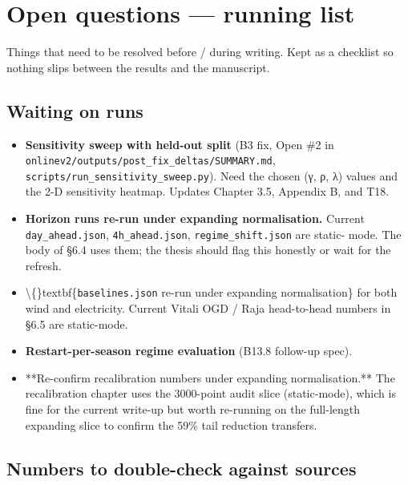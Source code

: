 \documentclass[11pt,a4paper,openany]{report}
\begin{document}
\chapter{Open questions — running list}

Things that need to be resolved before / during writing. Kept as a
checklist so nothing slips between the results and the manuscript.

\section{Waiting on runs}

\begin{itemize}
  \item [ ] \textbf{Sensitivity sweep with held-out split} (B3 fix, Open \#2 in
    \texttt{onlinev2/outputs/post\_fix\_deltas/SUMMARY.md},
    \texttt{scripts/run\_sensitivity\_sweep.py}). Need the chosen (γ, ρ, λ)
    values and the 2-D sensitivity heatmap. Updates Chapter 3.5,
    Appendix B, and T18.
  \item [ ] \textbf{Horizon runs re-run under expanding normalisation.} Current
    \texttt{day\_ahead.json}, \texttt{4h\_ahead.json}, \texttt{regime\_shift.json} are static-
    mode. The body of §6.4 uses them; the thesis should flag this
    honestly or wait for the refresh.
  \item [ ] \textbackslash\{\}textbf\{\texttt{baselines.json} re-run under expanding normalisation\} for
    both wind and electricity. Current Vitali OGD / Raja head-to-head
    numbers in §6.5 are static-mode.
  \item [ ] \textbf{Restart-per-season regime evaluation} (B13.8 follow-up
    spec).
  \item [ ] **Re-confirm recalibration numbers under expanding
    normalisation.** The recalibration chapter uses the 3000-point
    audit slice (static-mode), which is fine for the current write-up
    but worth re-running on the full-length expanding slice to confirm
    the 59\% tail reduction transfers.
\end{itemize}

\section{Numbers to double-check against sources}
\end{document}
